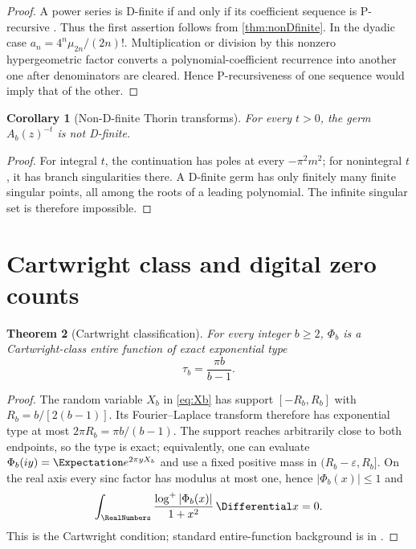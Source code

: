 \documentclass[11pt]{article}
\newtheorem{theorem}{Theorem}[section]
\newtheorem{corollary}[theorem]{Corollary}
\theoremstyle{definition}
\theoremstyle{remark}
\begin{document}
\begin{proof}
A power series is D-finite if and only if its coefficient sequence is P-recursive \cite{Stanley1980}.  Thus the first assertion follows from \cref{thm:nonDfinite}.  In the dyadic case
\(a_n=4^n\mu_{2n}/(2n)!\).  Multiplication or division by this nonzero hypergeometric factor converts a polynomial-coefficient recurrence into another one after denominators are cleared.  Hence P-recursiveness of one sequence would imply that of the other.
\end{proof}

\begin{corollary}[Non-D-finite Thorin transforms]\label{cor:negative-power-nondfinite}
For every \(t>0\), the germ \(A_b(z)^{-t}\) is not D-finite.
\end{corollary}

\begin{proof}
For integral \(t\), the continuation has poles at every
\(-\pi^2m^2\); for nonintegral \(t\), it has branch singularities there.  A D-finite germ has only finitely many finite singular points, all among the roots of a leading polynomial.  The infinite singular set is therefore impossible.
\end{proof}

\section{Cartwright class and digital zero counts}

\begin{theorem}[Cartwright classification]\label{thm:Cartwright}
For every integer \(b\ge2\), \(\Phi_b\) is a Cartwright-class entire function of exact exponential type
\begin{equation}\label{eq:type}
  \tau_b=\frac{\pi b}{b-1}.
\end{equation}
\end{theorem}

\begin{proof}
The random variable \(X_b\) in \eqref{eq:Xb} has support
\([-R_b,R_b]\) with \(R_b=b/[2(b-1)]\).  Its Fourier--Laplace transform therefore has exponential type at most
\(2\pi R_b=\pi b/(b-1)\).  The support reaches arbitrarily close to both endpoints, so the type is exact; equivalently, one can evaluate
\(\Phi_b(iy)=\Expectation e^{2\pi yX_b}\) and use a fixed positive mass in
\((R_b-\varepsilon,R_b]\).  On the real axis every sinc factor has modulus at most one, hence
\(|\Phi_b(x)|\le1\) and
\[
 \int_{\RealNumbers}\frac{\log^+|\Phi_b(x)|}{1+x^2}\,\Differential x=0.
\]
This is the Cartwright condition; standard entire-function background is in \cite{Levin1996}.
\end{proof}
\end{document}
